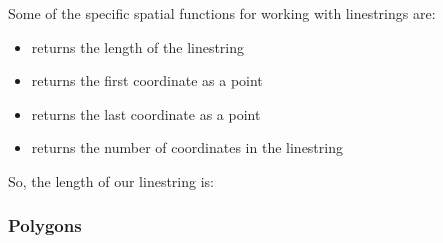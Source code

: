 \documentclass[a4paper,11pt,english]{sphinxmanual}
\begin{document}
\begin{sphinxVerbatim}[commandchars=\\\{\}]
       
\end{sphinxVerbatim}

Some of the specific spatial functions for working with linestrings are:
\begin{itemize}
\item {} 
 returns the length of the linestring

\item {} 
 returns the first coordinate as a point

\item {} 
 returns the last coordinate as a point

\item {} 
 returns the number of coordinates in the linestring

\end{itemize}

So, the length of our linestring is:

\begin{sphinxVerbatim}[commandchars=\\\{\}]
 
   
     
\end{sphinxVerbatim}

\begin{sphinxVerbatim}[commandchars=\\\{\}]
\end{sphinxVerbatim}


\subsubsection{Polygons}
\label{\detokenize{basic:polygons}}
\end{document}
